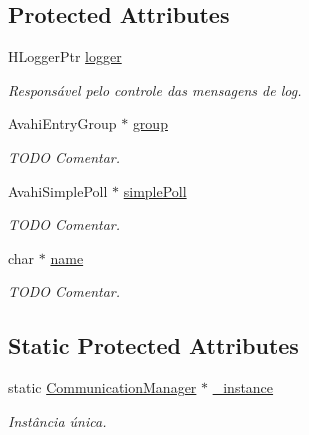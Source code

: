 \subsection*{Protected Attributes}
\begin{DoxyCompactItemize}
\item 
HLoggerPtr \hyperlink{classbr_1_1ufscar_1_1lince_1_1mmi_1_1zeroconf_1_1CommunicationManager_aca59ba5611ac71c96c668a6bad73405a}{logger}
\begin{DoxyCompactList}\small\item\em Responsável pelo controle das mensagens de log. \item\end{DoxyCompactList}\item 
AvahiEntryGroup $\ast$ \hyperlink{classbr_1_1ufscar_1_1lince_1_1mmi_1_1zeroconf_1_1CommunicationManager_a45a446d4698e5e9de6faa0f7c36e5af7}{group}
\begin{DoxyCompactList}\small\item\em TODO Comentar. \item\end{DoxyCompactList}\item 
AvahiSimplePoll $\ast$ \hyperlink{classbr_1_1ufscar_1_1lince_1_1mmi_1_1zeroconf_1_1CommunicationManager_abe4f838b42e69ac6c597c9e83a2962ff}{simplePoll}
\begin{DoxyCompactList}\small\item\em TODO Comentar. \item\end{DoxyCompactList}\item 
char $\ast$ \hyperlink{classbr_1_1ufscar_1_1lince_1_1mmi_1_1zeroconf_1_1CommunicationManager_aed1f1d17b6d93eee2a4b31db0530e9dd}{name}
\begin{DoxyCompactList}\small\item\em TODO Comentar. \item\end{DoxyCompactList}\end{DoxyCompactItemize}
\subsection*{Static Protected Attributes}
\begin{DoxyCompactItemize}
\item 
static \hyperlink{classbr_1_1ufscar_1_1lince_1_1mmi_1_1zeroconf_1_1CommunicationManager}{CommunicationManager} $\ast$ \hyperlink{classbr_1_1ufscar_1_1lince_1_1mmi_1_1zeroconf_1_1CommunicationManager_a661f79b7946162c5954531547e41c619}{\_\-instance}
\begin{DoxyCompactList}\small\item\em Instância única. \item\end{DoxyCompactList}\end{DoxyCompactItemize}


